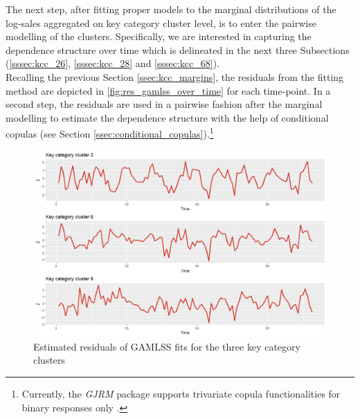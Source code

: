 
The next step, after fitting proper models to the marginal distributions of the log-sales aggregated on key category cluster level, is to enter the pairwise modelling of the clusters. Specifically, we are interested in capturing the dependence structure over time which is delineated in the next three Subsections (\ref{sssec:kcc_26}, \ref{sssec:kcc_28} and \ref{sssec:kcc_68}).
\\

Recalling the previous Section \ref{ssec:kcc_margins}, the residuals from the fitting method are depicted in \autoref{fig:res_gamlss_over_time} for each time-point. In a second step, the residuals are used in a pairwise fashion after the marginal modelling to estimate the dependence structure with the help of conditional copulas (see Section \ref{ssec:conditional_copulas}).\footnote{Currently, the \textit{GJRM} package supports trivariate copula functionalities for binary responses only \citep{marragjrm}.}

\begin{figure}[H]
\centering
  \includegraphics[width=0.95\linewidth]{figures/res_gamlss_over_time.png}
  \caption{Estimated residuals of GAMLSS fits for the three key category clusters}
  \label{fig:res_gamlss_over_time}
\end{figure}









